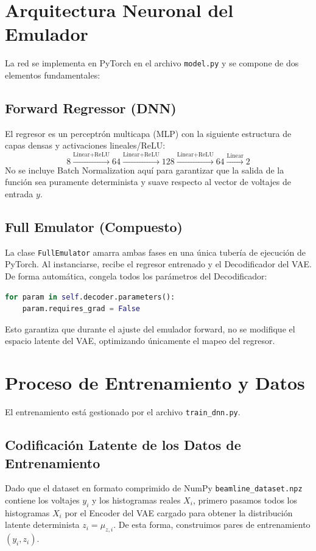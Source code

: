 \documentclass[12pt,letterpaper]{article}
\begin{document}
\section{Arquitectura Neuronal del Emulador}
La red se implementa en PyTorch en el archivo \texttt{model.py} y se compone de dos elementos fundamentales:

\subsection{Forward Regressor (DNN)}
El regresor es un perceptrón multicapa (MLP) con la siguiente estructura de capas densas y activaciones lineales/ReLU:
\begin{equation}
    8 \xrightarrow{\text{Linear+ReLU}} 64 \xrightarrow{\text{Linear+ReLU}} 128 \xrightarrow{\text{Linear+ReLU}} 64 \xrightarrow{\text{Linear}} 2
\end{equation}
No se incluye Batch Normalization aquí para garantizar que la salida de la función sea puramente determinista y suave respecto al vector de voltajes de entrada $y$.

\subsection{Full Emulator (Compuesto)}
La clase \texttt{FullEmulator} amarra ambas fases en una única tubería de ejecución de PyTorch. Al instanciarse, recibe el regresor entrenado y el Decodificador del VAE. De forma automática, congela todos los parámetros del Decodificador:
\begin{lstlisting}[language=Python]
for param in self.decoder.parameters():
    param.requires_grad = False
\end{lstlisting}
Esto garantiza que durante el ajuste del emulador forward, no se modifique el espacio latente del VAE, optimizando únicamente el mapeo del regresor.

\section{Proceso de Entrenamiento y Datos}
El entrenamiento está gestionado por el archivo \texttt{train\_dnn.py}.

\subsection{Codificación Latente de los Datos de Entrenamiento}
Dado que el dataset en formato comprimido de NumPy \texttt{beamline\_dataset.npz} contiene los voltajes $y_i$ y los histogramas reales $X_i$, primero pasamos todos los histogramas $X_i$ por el Encoder del VAE cargado para obtener la distribución latente determinista $z_i = \mu_{z,i}$. De esta forma, construimos pares de entrenamiento $(y_i, z_i)$.
\end{document}
